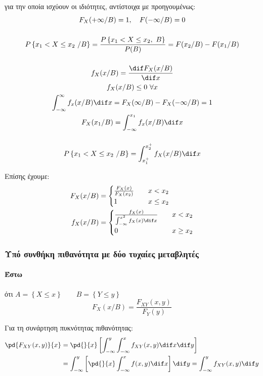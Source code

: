 \documentclass[11pt,a4paper,notitlepage,fleqn,final]{article}
\begin{document}
	για την οποία ισχύουν οι ιδιότητες, αντίστοιχα με προηγουμένως:
	\begin{gather*}
		F_X(+\infty/B) = 1, \quad F(-\infty/B) = 0 \\[3ex]
		P\left\lbrace x_1<X\leq x_2\ /B \right\rbrace
		=\frac{P\left\lbrace x_1 < X\leq x_2,\ B \right\rbrace}{P(B)}
		=F(x_2/B) - F(x_1/B)
		\\[3ex]
		f_X(x/B) = \frac{\dif F_X(x/B)}{\dif x} \\
		f_X(x/B) \leq 0 \ \forall x \\
		\int_{-\infty}^{\infty} f_x(x/B) \dif x = F_X(\infty/B)
		- F_X(-\infty/B) = 1 \\
		F_X(x_1/B) = \int_{-\infty}^{x_1} f_x(x/B)\dif x
		\\[3ex]
		P \left\lbrace x_1<X\leq x_2\ /B \right\rbrace
	    = \int_{x_1^+}^{x_2^+} f_X(x/B)\dif x
	\end{gather*}
	
	Επίσης έχουμε:
	\begin{align*}
		F_X(x/B) &= \begin{cases}
		\frac{F_X(x)}{F_X(x_2)} &\quad x<x_2 \\
		1 &\quad x\leq x_2
		\end{cases} \\
		f_X(x/B) &= \begin{cases}
		\frac{f_X(x)}{\int_{-\infty}^{x^2} f_X(x) \dif x}
		&\quad x<x_2 \\ 0 &\quad x \geq x_2
		\end{cases}
	\end{align*}
	
	\subsubsection{Υπό συνθήκη πιθανότητα με δύο τυχαίες μεταβλητές}
	
	\paragraph{Έστω} ότι \( A=\left\lbrace X \leq x \right\rbrace 
	\qquad B = \left\lbrace Y \leq y \right\rbrace
	\)
	\[
	\boxed{F_X(x/B)
		= \frac{F_{XY}(x,y)}{F_Y(y)}} 
	\]
	
	Για τη συνάρτηση πυκνότητας πιθανότητας:
	\begin{align*}
		\pd{F_{XY}(x,y)}{x} &= \pd{}{x} \left[
		\int_{-\infty}^{y} \int_{-\infty}^{x} f_{XY} (x,y)\dif x\dif y
		\right] \\ &=
		\int_{-\infty}^{y} \left[\pd{}{x}\int_{-\infty}^{x}f(x,y)
		\dif x\right]\dif y = \int_{-\infty}^{y} f_{XY}(x,y)\dif y
	\end{align*}
	
\end{document}
